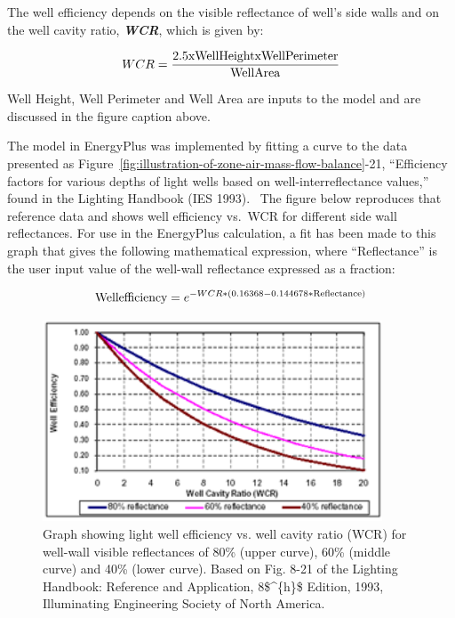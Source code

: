 The well efficiency depends on the visible reflectance of well's side walls and on the well cavity ratio, \textbf{\emph{WCR}}, which is given by:

\begin{equation}
WCR = \frac{{{\rm{2}}{\rm{.5 x Well Height x Well Perimeter}}}}{{{\rm{Well Area}}}}
\end{equation}

Well Height, Well Perimeter and Well Area are inputs to the model and are discussed in the figure caption above.

The model in EnergyPlus was implemented by fitting a curve to the data presented as Figure~\ref{fig:illustration-of-zone-air-mass-flow-balance}-21, ``Efficiency factors for various depths of light wells based on well-interreflectance values,'' found in the Lighting Handbook (IES 1993).~ The figure below reproduces that reference data and shows well efficiency vs.~WCR for different side wall reflectances. For use in the EnergyPlus calculation, a fit has been made to this graph that gives the following mathematical expression, where ``Reflectance'' is the user input value of the well-wall reflectance expressed as a fraction:

\begin{equation}
{\rm{Well efficiency}} = {e^{ - WCR*(0.16368 - 0.144678*{\rm{Reflectance}})}}
\end{equation}

\begin{figure}[hbtp] %
\centering
\includegraphics[width=0.9\textwidth, height=0.9\textheight, keepaspectratio=true]{media/image910.png}
\caption{Graph showing light well efficiency vs. well cavity ratio (WCR) for well-wall visible reflectances of 80\% (upper curve), 60\% (middle curve) and 40\% (lower curve). Based on Fig. 8-21 of the Lighting Handbook: Reference and Application, 8\$\^{}\{h\}\$ Edition, 1993, Illuminating Engineering Society of North America. \protect \label{fig:graph-showing-light-well-efficiency-vs.-well}}
\end{figure}

